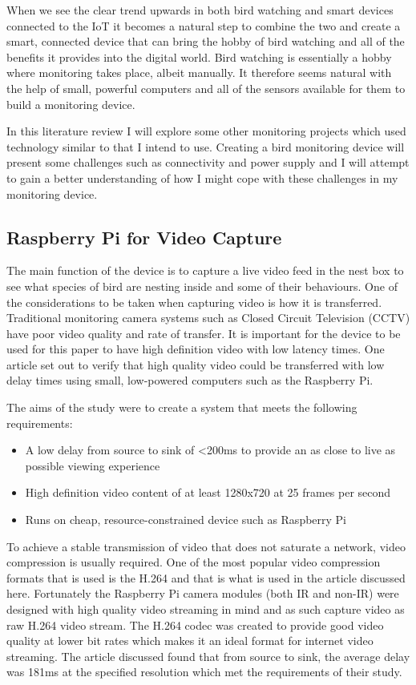 \documentclass[10pt,a4paper]{article}
\begin{document}
When we see the clear trend upwards in both bird watching and smart devices connected to the IoT it becomes a natural step to combine the two and create a smart, connected device that can bring the hobby of bird watching and all of the benefits it provides into the digital world. Bird watching is essentially a hobby where monitoring takes place, albeit manually. It therefore seems natural with the help of small, powerful computers and all of the sensors available for them to build a monitoring device. 

In this literature review I will explore some other monitoring projects which used technology similar to that I intend to use. Creating a bird monitoring device will present some challenges such as connectivity and power supply and I will attempt to gain a better understanding of how I might cope with these challenges in my monitoring device.
\subsection{Raspberry Pi for Video Capture}
The main function of the device is to capture a live video feed in the nest box to see what species of bird are nesting inside and some of their behaviours. One of the considerations to be taken when capturing video is how it is transferred. Traditional monitoring camera systems such as Closed Circuit Television (CCTV) have poor video quality and rate of transfer. It is important for the device to be used for this paper to have high definition video with low latency times. One article\cite{Jennehag2016} set out to verify that high quality video could be transferred with low delay times using small, low-powered computers such as the Raspberry Pi. 

The aims of the study were to create a system that meets the following requirements:
\begin{itemize}
\item A low delay from source to sink of \textless200ms to provide an as close to live as possible viewing experience
\item High definition video content of at least 1280x720 at 25 frames per second
\item Runs on cheap, resource-constrained device such as Raspberry Pi
\end{itemize}

To achieve a stable transmission of video that does not saturate a network, video compression is usually required. One of the most popular video compression formats that is used is the H.264 and that is what is used in the article discussed here. Fortunately the Raspberry Pi camera modules (both IR and non-IR) were designed with high quality video streaming in mind and as such capture video as raw H.264 video stream\cite{piDoc}. The H.264 codec was created to provide good video quality at lower bit rates which makes it an ideal format for internet video streaming\cite{Wiegand2003}. The article discussed found that from source to sink, the average delay was 181ms at the specified resolution which met the requirements of their study.
\end{document}
